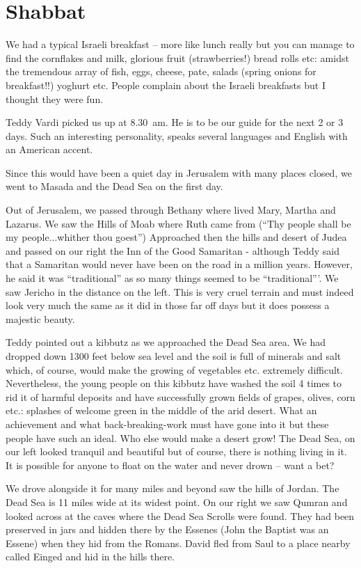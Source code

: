 \section{Shabbat}

We had a typical Israeli breakfast -- more like lunch really but you
can manage to find the cornflakes and milk, glorious fruit
(strawberries!) bread rolls etc: amidst the tremendous array of fish,
eggs, cheese, pate, salads (spring onions for breakfast!!) yoghurt
etc. People complain about the Israeli breakfasts but I thought they
were fun.

Teddy Vardi picked us up at 8.30~am. He is to be our guide for the
next 2 or 3 days. Such an interesting personality, speaks several
languages and English with an American accent.

Since this would have been a quiet day in Jerusalem with many places
closed, we went to Masada and the Dead Sea on the first day.

Out of Jerusalem, we passed through Bethany where lived Mary, Martha
and Lazarus. We saw the Hills of Moab where Ruth came from (``Thy
people shall be my people...whither thou goest'') Approached then the
hills and desert of Judea and passed on our right the Inn of the Good
Samaritan - although Teddy said that a Samaritan would never have been
on the road in a million years. However, he said it was
``traditional'' as so many things seemed to be ``traditional'''. We
saw Jericho in the distance on the left. This is very cruel terrain
and must indeed look very much the same as it did in those far off
days but it does possess a majestic beauty.

Teddy pointed out a kibbutz as we approached the Dead Sea area. We had
dropped down 1300 feet below sea level and the soil is full of
minerals and salt which, of course, would make the growing of
vegetables etc. extremely difficult. Nevertheless, the young people on
this kibbutz have washed the soil 4 times to rid it of harmful
deposits and have successfully grown fields of grapes, olives, corn
etc.: splashes of welcome green in the middle of the arid desert. What
an achievement and what back-breaking-work must have gone into it but
these people have such an ideal. Who else would make a desert grow!
The Dead Sea, on our left looked tranquil and beautiful but of course,
there is nothing living in it. It is possible for anyone to float on
the water and never drown -- want a bet?

We drove alongside it for many miles and beyond saw the hills of
Jordan. The Dead Sea is 11 miles wide at its widest point. On our
right we saw Qumran and looked across at the caves where the Dead Sea
Scrolls were found. They had been preserved in jars and hidden there
by the Essenes (John the Baptist was an Essene) when they hid from the
Romans. David fled from Saul to a place nearby called Einged and hid
in the hills there.

